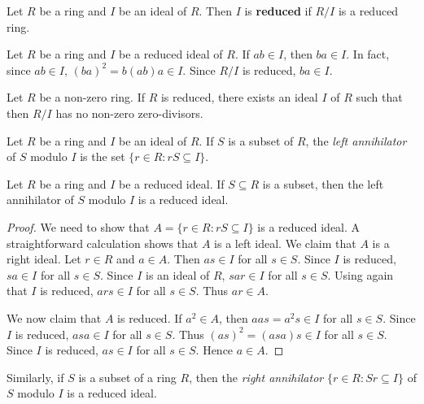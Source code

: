 \begin{definition}
    Let $R$ be a ring and $I$ be an ideal of $R$. 
    Then $I$ is \textbf{reduced} if $R/I$ is a reduced ring. 
\end{definition}

Let $R$ be a ring and 
$I$ be a reduced ideal of $R$. If $ab\in I$, then 
$ba\in I$. In fact, since $ab\in I$, 
$(ba)^2=b(ab)a\in I$.
Since $R/I$ is reduced, $ba\in I$. 

 \begin{theorem}
 \label{thm:AndrunakevicRjabuhin}
 	Let $R$ be a non-zero ring. If $R$ is reduced, there exists
 	an ideal $I$ of $R$ such that 
 	then $R/I$ has no non-zero zero-divisors. 
 \end{theorem}

 Let $R$ be a ring and $I$ be an ideal of $R$. If $S$ 
 is a subset of $R$, the \emph{left annihilator} of $S$
 modulo $I$ is the set $\{r\in R:rS\subseteq I\}$.  

 \begin{lemma}
    Let $R$ be a ring and $I$ be a reduced ideal. 
    If $S\subseteq R$ is a subset, then 
    the left annihilator of $S$ modulo $I$ 
    is a reduced ideal. 
 \end{lemma}

\begin{proof}
    We need to show that $A=\{r\in R:rS\subseteq I\}$ 
    is a reduced ideal. 
    A straightforward calculation shows that $A$ is 
    a left ideal. We claim that $A$ is a right ideal. Let $r\in R$
    and $a\in A$. Then 
    $as\in I$ for all $s\in S$. Since $I$ is reduced, $sa\in I$ for all $s\in S$. Since 
    $I$ is an ideal of $R$, $sar\in I$
    for all $s\in S$. Using again 
    that $I$ is reduced, 
    $ars\in I$ for all $s\in S$. Thus 
    $ar\in A$. 
    
    We now claim that $A$ is reduced. If $a^2\in A$, then 
    $aas=a^2s\in I$ for all $s\in S$. 
    Since $I$ is reduced, $asa\in I$ for
    all $s\in S$. Thus $(as)^2=(asa)s\in I$ for all $s\in S$. 
    Since $I$ is reduced, $as\in I$ for all $s\in S$. Hence $a\in A$. 
\end{proof}

Similarly, if $S$ is a subset of a ring $R$, then 
the \emph{right annihilator} 
$\{r\in R:Sr\subseteq I\}$ 
of $S$ modulo $I$ 
is a reduced ideal. 

